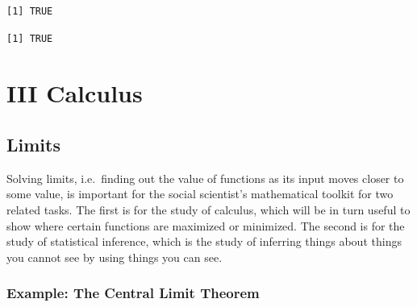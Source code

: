 \documentclass[
  letterpaper,
]{book}
\newenvironment{Shaded}{\begin{snugshade}}{\end{snugshade}}
\newcommand{\CommentTok}[1]{\textcolor[rgb]{0.37,0.37,0.37}{#1}}
\newcommand{\FunctionTok}[1]{\textcolor[rgb]{0.28,0.35,0.67}{#1}}
\newcommand{\NormalTok}[1]{\textcolor[rgb]{0.00,0.23,0.31}{#1}}
\newcommand{\OtherTok}[1]{\textcolor[rgb]{0.00,0.23,0.31}{#1}}
\newcommand{\SpecialCharTok}[1]{\textcolor[rgb]{0.37,0.37,0.37}{#1}}
\newcommand{\StringTok}[1]{\textcolor[rgb]{0.13,0.47,0.30}{#1}}
\theoremstyle{definition}
\theoremstyle{definition}
\theoremstyle{plain}
\theoremstyle{definition}
\theoremstyle{plain}
\theoremstyle{plain}
\theoremstyle{remark}
\begin{document}
\begin{verbatim}
[1] TRUE
\end{verbatim}

\begin{Shaded}
\end{Shaded}

\begin{verbatim}
[1] TRUE
\end{verbatim}

\part{III Calculus}

\hypertarget{limits-precalc}{%
\chapter{Limits}\label{limits-precalc}}

Solving limits, i.e.~finding out the value of functions as its input
moves closer to some value, is important for the social scientist's
mathematical toolkit for two related tasks. The first is for the study
of calculus, which will be in turn useful to show where certain
functions are maximized or minimized. The second is for the study of
statistical inference, which is the study of inferring things about
things you cannot see by using things you can see.

\hypertarget{example-the-central-limit-theorem}{%
\section*{Example: The Central Limit
Theorem}\label{example-the-central-limit-theorem}}
\end{document}
